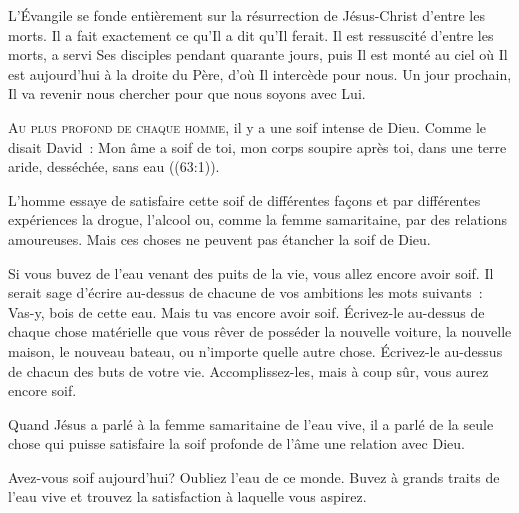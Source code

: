 
L'Évangile  se fonde entièrement sur la résurrection
 de Jésus-Christ d'entre les morts. Il a fait exactement ce qu'Il a dit
 qu'Il ferait. Il est ressuscité d'entre les morts, a servi Ses disciples
 pendant quarante jours, puis Il est monté au ciel où Il est aujourd'hui
 à la droite du Père, d'où Il intercède pour nous. Un jour prochain,
 Il va revenir nous chercher pour que nous soyons avec Lui.

\dvrule






\lettrine{A}{u plus profond de chaque homme,} il y a une soif intense de Dieu.
 Comme le disait David~: 
 \og Mon âme a soif de toi, mon corps soupire après toi,
 dans une terre aride, desséchée, sans eau \fg{}
 ((63:1)). 

L'homme essaye de satisfaire cette soif de différentes façons
 et par différentes expériences \ocadr la drogue, l'alcool ou,
 comme la femme samaritaine, par des relations amoureuses.
 Mais ces choses ne peuvent pas étancher la soif de Dieu.


Si vous buvez de l'eau venant des puits de la vie,
 vous allez encore avoir soif. Il serait sage d'écrire au-dessus
 de chacune de vos ambitions les mots suivants~:
 \og Vas-y, bois de cette eau. Mais tu vas encore avoir soif. \fg{}
 Écrivez-le  au-dessus de chaque chose matérielle
 que vous rêver de posséder \ocadr la nouvelle voiture, la nouvelle maison,
 le nouveau bateau, ou n'importe quelle autre chose.
 Écrivez-le au-dessus de chacun des buts de votre vie.
 Accomplissez-les, mais à coup sûr, vous aurez encore soif.

Quand Jésus a parlé à la femme samaritaine de l'eau vive,
 il a parlé de la seule chose qui puisse satisfaire
 la soif profonde de l'âme \ocadr une relation avec Dieu.

Avez-vous soif aujourd'hui? Oubliez l'eau de ce monde.
 Buvez à grands traits de l'eau vive et trouvez la satisfaction
 à laquelle vous aspirez.

\dvrule




